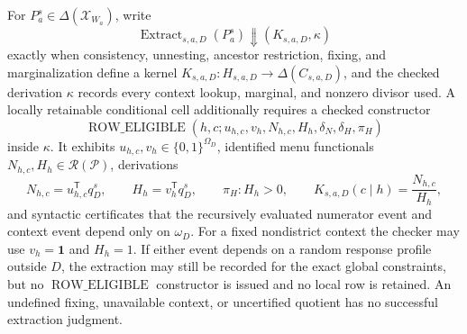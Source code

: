 For \(P_a^s\in\Delta(\mathcal X_{W_a})\), write
\[
\operatorname{Extract}_{s,a,D}(P_a^s)\Downarrow(K_{s,a,D},\kappa)
\]
exactly when consistency, unnesting, ancestor restriction, fixing, and marginalization define a kernel \(K_{s,a,D}:H_{s,a,D}\to\Delta(C_{s,a,D})\), and the checked derivation \(\kappa\) records every context lookup, marginal, and nonzero divisor used.  A locally retainable conditional cell additionally requires a checked constructor
\[
\operatorname{ROW\_ELIGIBLE}(h,c;u_{h,c},v_h,N_{h,c},H_h,\delta_N,\delta_H,\pi_H)
\]
inside \(\kappa\).  It exhibits \(u_{h,c},v_h\in\{0,1\}^{\Omega_D}\), identified menu functionals \(N_{h,c},H_h\in\mathscr R(\mathcal P)\), derivations
\[
N_{h,c}=u_{h,c}^{\mathsf T}q_D^s,
\qquad
H_h=v_h^{\mathsf T}q_D^s,
\qquad
\pi_H:H_h>0,
\qquad
K_{s,a,D}(c\mid h)=\frac{N_{h,c}}{H_h},
\]
and syntactic certificates that the recursively evaluated numerator event and context event depend only on \(\omega_D\).  For a fixed nondistrict context the checker may use \(v_h=\mathbf 1\) and \(H_h=1\).  If either event depends on a random response profile outside \(D\), the extraction may still be recorded for the exact global constraints, but no \(\operatorname{ROW\_ELIGIBLE}\) constructor is issued and no local row is retained.  An undefined fixing, unavailable context, or uncertified quotient has no successful extraction judgment.